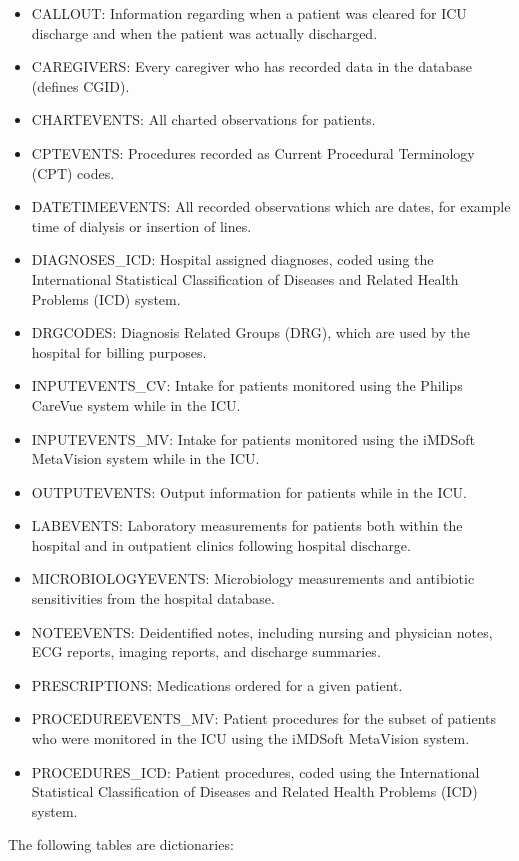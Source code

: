 \documentclass[english]{article}
\begin{document}
\begin{itemize}
  \item CALLOUT: Information regarding when a patient was cleared for ICU discharge and when the patient was actually discharged.
  \item CAREGIVERS: Every caregiver who has recorded data in the database (defines CGID).
  \item CHARTEVENTS: All charted observations for patients.
  \item CPTEVENTS: Procedures recorded as Current Procedural Terminology (CPT) codes.
  \item DATETIMEEVENTS: All recorded observations which are dates, for example time of dialysis or insertion of lines.
  \item DIAGNOSES\_ICD: Hospital assigned diagnoses, coded using the International Statistical Classification of Diseases and Related Health Problems (ICD) system.
  \item DRGCODES: Diagnosis Related Groups (DRG), which are used by the hospital for billing purposes.
  \item INPUTEVENTS\_CV: Intake for patients monitored using the Philips CareVue system while in the ICU.
  \item INPUTEVENTS\_MV: Intake for patients monitored using the iMDSoft MetaVision system while in the ICU.
  \item OUTPUTEVENTS: Output information for patients while in the ICU.
  \item LABEVENTS: Laboratory measurements for patients both within the hospital and in outpatient clinics following hospital discharge.
  \item MICROBIOLOGYEVENTS: Microbiology measurements and antibiotic sensitivities from the hospital database.
  \item NOTEEVENTS: Deidentified notes, including nursing and physician notes, ECG reports, imaging reports, and discharge summaries.
  \item PRESCRIPTIONS: Medications ordered for a given patient.
  \item PROCEDUREEVENTS\_MV: Patient procedures for the subset of patients who were monitored in the ICU using the iMDSoft MetaVision system.
  \item PROCEDURES\_ICD: Patient procedures, coded using the International Statistical Classification of Diseases and Related Health Problems (ICD) system.
\end{itemize}

The following tables are dictionaries:
\end{document}
